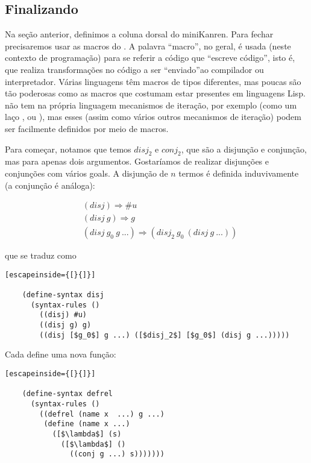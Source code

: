 

  \subsection{Finalizando}

  Na seção anterior, definimos a coluna dorsal do miniKanren. Para
  fechar precisaremos usar as macros do . A palavra
  ``macro'', no geral, é usada (neste contexto de programação) para se
  referir a código que ``escreve código'', isto é, que realiza
  transformações no código a ser ``enviado''ao compilador ou
  interpretador. Várias linguagens têm macros de tipos diferentes, mas
  poucas são tão poderosas como as macros que costumam estar presentes
  em linguagens Lisp.  não tem na própria linguagem
  mecanismos de iteração, por exemplo (como um laço ,
  ou ), mas esses (assim como vários outros
  mecanismos de iteração) podem ser facilmente definidos por meio de
  macros.

  Para começar, notamos que temos $disj_2$ e $conj_2$, que são a
  disjunção e conjunção, mas para apenas dois argumentos. Gostaríamos
  de realizar disjunções e conjunções com vários goals. A disjunção de
  $n$ termos é definida induvivamente (a conjunção é análoga):

  \begin{align*}
    &(disj) \Rightarrow \#u \\
    &(disj\ g) \Rightarrow g \\
    &(disj\ g_0\ g\ ...) \Rightarrow (disj_2\ g_0\ (disj\ g\ ...))
  \end{align*}

  \noindent que se traduz como

  \begin{lstlisting}[escapeinside={[}{]}]

    (define-syntax disj
      (syntax-rules ()
        ((disj) #u)
        ((disj g) g)
        ((disj [$g_0$] g ...) ([$disj_2$] [$g_0$] (disj g ...)))))

  \end{lstlisting}

  Cada  define uma nova função:

  \begin{lstlisting}[escapeinside={[}{]}]

    (define-syntax defrel
      (syntax-rules ()
        ((defrel (name x  ...) g ...)
         (define (name x ...)
           ([$\lambda$] (s)
             ([$\lambda$] ()
               ((conj g ...) s)))))))

  \end{lstlisting}
             
